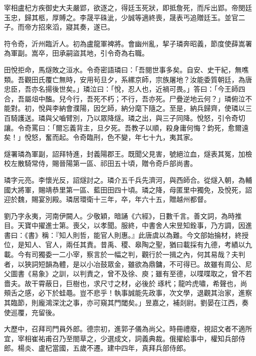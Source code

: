 \begin{pinyinscope}
 宰相盧杞方疾御史大夫嚴郢，欲逐之，得廷玉死狀，即抵詹死，而斥出郢。帝閔廷玉忠，歸其柩，厚賻之。李晟平硃泚，少誠等適終喪，晟表丐追贈廷玉。並官二子。而帝方招來滔，寢其奏，遂已。



 符令奇，沂州臨沂人。初為盧龍軍裨將。會幽州亂，挈子璘奔昭義，節度使薛嵩署為軍副。嵩卒，田承嗣盜其地，引令奇為右職。



 田悅拒命，馬燧敗之洹水。令奇密語璘曰：「吾閱世事多矣。自安、史干紀，無噍類。吾觀田氏覆亡無時，安用茍旦夕，系縲京師，宗族屠地？汝能委質朝廷，為唐忠臣，吾亦名揚後世矣。」璘泣曰：「悅，忍人也，近禍可畏。」答曰：「今王師四合，吾屬俎中醢。兒今行，吾死不朽；不行，吾亦死。尸疊逆地云何？」璘俯泣不能對。初，悅與李納會濮陽，因乞師，納分麾下隨之。至是，納兵歸齊，使璘以三百騎護送。璘與父嚙臂別，乃以眾降燧。璘之出，與三子同降。悅怒，引令奇切讓。令奇罵曰：「爾忘義背主，旦夕死。吾教子以順，殺身庸何悔？鈞死，愈爾遠矣！」悅怒，奮而起。令奇臨刑，色不變，年七十九，夷其家。



 燧署璘為軍副，詔拜特進，封義陽郡王。既聞父見害，號絕泣血，燧表其冤，加檢校左散騎常侍，賜晉陽第一區、祁田五十頃，贈令奇戶部尚書。



 璘字元亮。李懷光反，詔燧討之。璘介五千兵先濟河，與西師合。從燧入朝，為輔國大將軍，賜靖恭里第一區、藍田田四十頃。璘之降，母匿里中獨免，及悅死，詔迎於魏，賜宴別殿。璘居環衛十三年，卒，年六十五，贈越州都督。



 劉乃字永夷，河南伊闕人。少敬穎，暗誦《六經》，日數千言。善文詞，為時推目。天寶中擢進士第。喪父，以孝聞。服終，中書舍人宋昱知銓事，乃方調，因進書曰：《書》稱：『知人則哲，能官人則惠。』此唐虞以為難。今文部始掄材，終授位，是知人、官人，兩任其責。昔禹、稷、皋陶之聖，猶曰載採有九德，考績以九載。今有司獨委一二小宰，察言於一幅之判，觀行於一揖之內，何其易哉？夫判者，以狹詞短韻為體，是以小冶鼓眾金，雖欲為鼎鏞，不可得已。故雖有周公、尼父圖書《易象》之訓，以判責之，曾不及徐、庾；雖有至德，以喋喋取之，曾不若嗇夫。故干霄蔽日，巨樹也，求尺寸之材，必後於琢杙；龍吟虎嘯，希聲也，尚頰舌之感，必下於蛙黽。豈不悲乎！執事誠能先政事，次文學，退觀其治家，進察其臨節，則龐鴻深沈之事，亦可窺其門閾矣。」昱嘉之，補剡尉。劉晏在江西，奏使巡覆，充留後。



 大歷中，召拜司門員外郎。德宗初，進郭子儀為尚父。時冊禮廢，視詔文者不適所宜，宰相崔祐甫召乃至閤草之，少選成文，詞義典裁。俄擢給事中，權知兵部侍郎。楊炎、盧杞當國，五歲不遷。建中四年，真拜兵部侍郎。




\end{pinyinscope}
